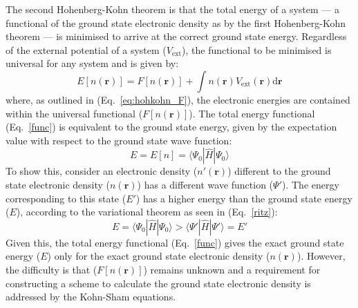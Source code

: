 The second Hohenberg-Kohn theorem is that the total energy of a system --- a functional of the ground state electronic density as by the first Hohenberg-Kohn theorem --- is minimised to arrive at the correct ground state energy. Regardless of the external potential of a system ($V_{\mathrm{ext}}$), the functional to be minimised is universal for any system and is given by:
\begin{equation} \label{func}
E[n(\mathbf{r})] = F[n(\mathbf{r})] + \int n(\mathbf{r}) V_{\mathrm{ext}}(\mathbf{r}) \mathrm{d} \mathbf{r}
\end{equation}
where, as outlined in (Eq.~\ref{eq:hohkohn_F}), the electronic energies are contained within the universal functional ($F[n(\mathbf{r})]$). The total energy functional (Eq.~\ref{func}) is equivalent to the ground state energy, given by the expectation value with respect to the ground state wave function:
%
\begin{equation}
    E = E[n] = \langle \Psi_0 | \hat{H} | \Psi_0 \rangle
\end{equation}
%
To show this, consider an electronic density ($n'(\mathbf{r})$) different to the ground state electronic density ($n(\mathbf{r})$) has a different wave function ($\Psi'$). The energy corresponding to this state ($E'$) has a higher energy than the ground state energy ($E$), according to the variational theorem as seen in (Eq.~\ref{ritz}):
%
\begin{equation}
    E = \langle \Psi_0 | \hat{H} | \Psi_0 \rangle > \langle \Psi ' | \hat{H} | \Psi ' \rangle = E'
\end{equation}
Given this, the total energy functional (Eq.~\ref{func}) gives the exact ground state energy ($E$) only for the exact ground state electronic density ($n(\mathbf{r})$). However, the difficulty is that ($F[n(\mathbf{r})]$) remains unknown and a requirement for constructing a scheme to calculate the ground state electronic density is addressed by the Kohn-Sham equations.
%
